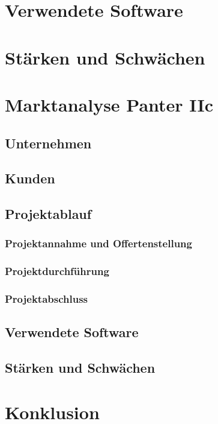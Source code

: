 \section{Verwendete Software}


\section{Stärken und Schwächen}


\section{Marktanalyse Panter IIc}
\subsection{Unternehmen}
\subsection{Kunden}
\subsection{Projektablauf}
\subsubsection{Projektannahme und Offertenstellung}
\subsubsection{Projektdurchführung}
\subsubsection{Projektabschluss}
\subsection{Verwendete Software}
\subsection{Stärken und Schwächen}

\section{Konklusion}
